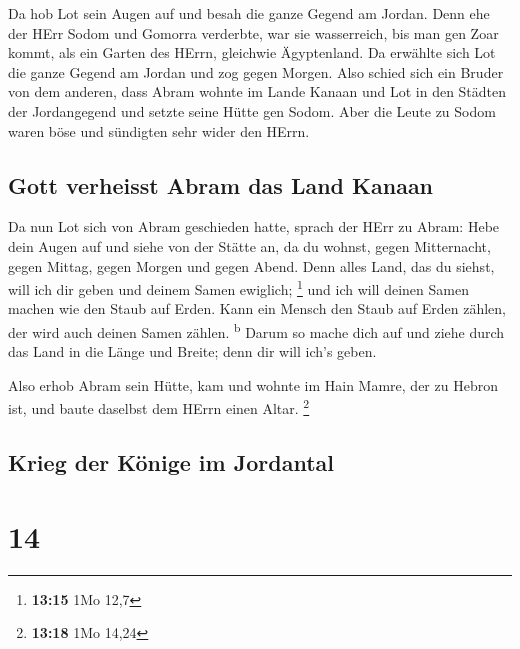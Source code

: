  Da hob Lot sein Augen auf und besah die ganze Gegend am
Jordan. Denn ehe der HErr Sodom und Gomorra verderbte, war sie
wasserreich, bis man gen Zoar kommt, als ein Garten des HErrn, gleichwie
Ägyptenland.  Da erwählte sich Lot die ganze Gegend am
Jordan und zog gegen Morgen. Also schied sich ein Bruder von dem
anderen,  dass Abram wohnte im Lande Kanaan und Lot in
den Städten der Jordangegend und setzte seine Hütte gen Sodom.
 Aber die Leute zu Sodom waren böse und sündigten sehr
wider den HErrn.

\hypertarget{gott-verheisst-abram-das-land-kanaan}{%
\subsection{Gott verheisst Abram das Land
Kanaan}\label{gott-verheisst-abram-das-land-kanaan}}

 Da nun Lot sich von Abram geschieden hatte, sprach der
HErr zu Abram: Hebe dein Augen auf und siehe von der Stätte an, da du
wohnst, gegen Mitternacht, gegen Mittag, gegen Morgen und gegen Abend.
 Denn alles Land, das du siehst, will ich dir geben und
deinem Samen ewiglich; \footnote{\textbf{13:15} 1Mo 12,7}
 und ich will deinen Samen machen wie den Staub auf
Erden. Kann ein Mensch den Staub auf Erden zählen, der wird auch deinen
Samen zählen. \textsuperscript{b}  Darum so mache dich
auf und ziehe durch das Land in die Länge und Breite; denn dir will
ich's geben.

 Also erhob Abram sein Hütte, kam und wohnte im Hain
Mamre, der zu Hebron ist, und baute daselbst dem HErrn einen Altar.
\footnote{\textbf{13:18} 1Mo 14,24}

\hypertarget{krieg-der-kuxf6nige-im-jordantal}{%
\subsection{Krieg der Könige im
Jordantal}\label{krieg-der-kuxf6nige-im-jordantal}}

\hypertarget{section-13}{%
\section{14}\label{section-13}}

